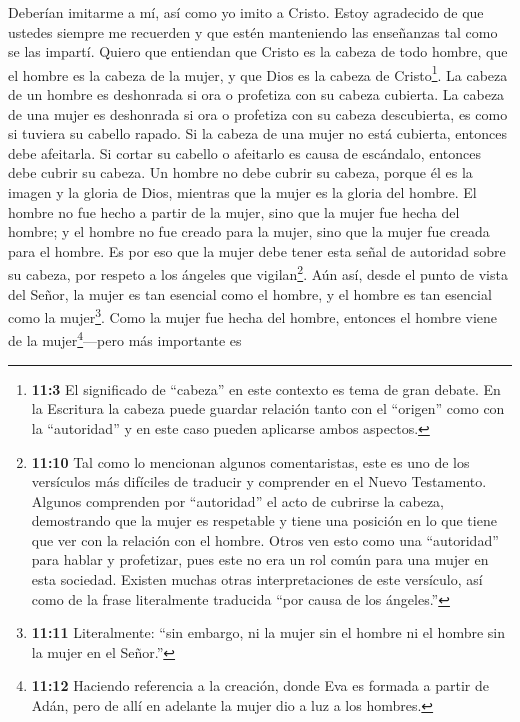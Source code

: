  Deberían imitarme a mí, así como yo imito a Cristo.
 Estoy agradecido de que ustedes siempre me recuerden y que
estén manteniendo las enseñanzas tal como se las impartí. 
Quiero que entiendan que Cristo es la cabeza de todo hombre, que el
hombre es la cabeza de la mujer, y que Dios es la cabeza de
Cristo\footnote{\textbf{11:3} El significado de ``cabeza'' en este
  contexto es tema de gran debate. En la Escritura la cabeza puede
  guardar relación tanto con el ``origen'' como con la ``autoridad'' y
  en este caso pueden aplicarse ambos aspectos.}.  La cabeza
de un hombre es deshonrada si ora o profetiza con su cabeza cubierta.
 La cabeza de una mujer es deshonrada si ora o profetiza con
su cabeza descubierta, es como si tuviera su cabello rapado.
 Si la cabeza de una mujer no está cubierta, entonces debe
afeitarla. Si cortar su cabello o afeitarlo es causa de escándalo,
entonces debe cubrir su cabeza.  Un hombre no debe cubrir su
cabeza, porque él es la imagen y la gloria de Dios, mientras que la
mujer es la gloria del hombre.  El hombre no fue hecho a
partir de la mujer, sino que la mujer fue hecha del hombre; 
y el hombre no fue creado para la mujer, sino que la mujer fue creada
para el hombre.  Es por eso que la mujer debe tener esta
señal de autoridad sobre su cabeza, por respeto a los ángeles que
vigilan\footnote{\textbf{11:10} Tal como lo mencionan algunos
  comentaristas, este es uno de los versículos más difíciles de traducir
  y comprender en el Nuevo Testamento. Algunos comprenden por
  ``autoridad'' el acto de cubrirse la cabeza, demostrando que la mujer
  es respetable y tiene una posición en lo que tiene que ver con la
  relación con el hombre. Otros ven esto como una ``autoridad'' para
  hablar y profetizar, pues este no era un rol común para una mujer en
  esta sociedad. Existen muchas otras interpretaciones de este
  versículo, así como de la frase literalmente traducida ``por causa de
  los ángeles.''}.  Aún así, desde el punto de vista del
Señor, la mujer es tan esencial como el hombre, y el hombre es tan
esencial como la mujer\footnote{\textbf{11:11} Literalmente: ``sin
  embargo, ni la mujer sin el hombre ni el hombre sin la mujer en el
  Señor.''}.  Como la mujer fue hecha del hombre, entonces
el hombre viene de la mujer\footnote{\textbf{11:12} Haciendo referencia
  a la creación, donde Eva es formada a partir de Adán, pero de allí en
  adelante la mujer dio a luz a los hombres.}---pero más importante es

